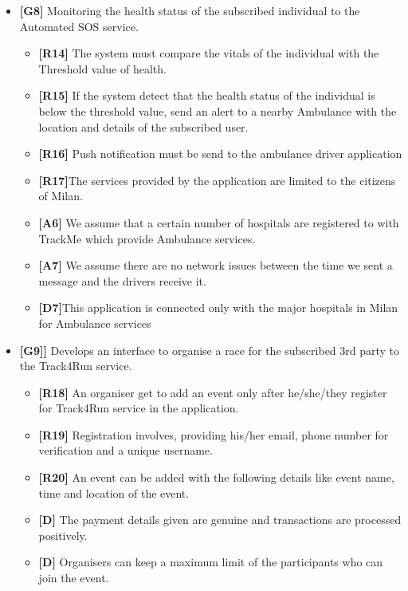 \begin{itemize}
\item\textbf{[G8]} Monitoring the health status of the subscribed individual to the Automated SOS service.

\begin{itemize}
\item\textbf{[R14]} The system must compare the vitals of the individual with the Threshold value of health.
\item\textbf{[R15]} If the system detect that the health status of the individual is below the threshold value, send an alert to a nearby Ambulance with the location and details of the subscribed user.
\item\textbf{[R16]} Push notification must be send to the ambulance driver application 
\item\textbf{[R17]}The services provided by the application are limited to the citizens of Milan.
\item \textbf{[A6]} We assume that a certain number of hospitals are registered to with TrackMe which provide Ambulance services.
\item \textbf{[A7]} We assume there are no network issues between the time we sent a message and the drivers receive it.
\item\textbf{[D7]}This application is connected only with the major hospitals in Milan for Ambulance services\newline
\end{itemize}

\item\textbf{[G9]]}  Develops an interface to organise a race for the subscribed 3rd party to the Track4Run service.

\begin{itemize}
\item\textbf{[R18]} An organiser get to add an event only after he/she/they register for Track4Run service in the application.
\item\textbf{[R19]} Registration involves, providing his/her email, phone number for verification and a unique username.
\item\textbf{[R20]} An event can be added with the following details like event name, time and location of the event.
\item\textbf{[D]} The payment details given are genuine and transactions are processed positively.
\item\textbf{[D]} Organisers can keep a maximum limit of the participants who can join the event.\newline
\end{itemize}


\end{itemize}
